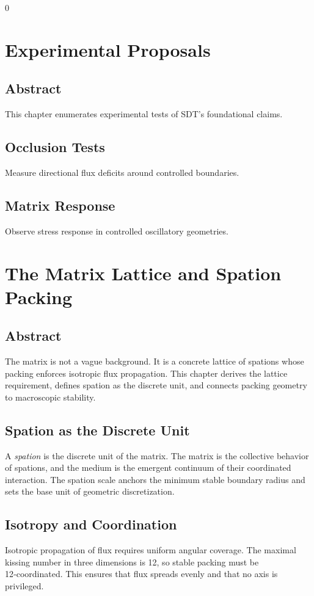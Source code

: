 0\documentclass[12pt]{book}
\begin{document}
\chapter{Experimental Proposals}

\section*{Abstract}
This chapter enumerates experimental tests of SDT’s foundational claims.

\section{Occlusion Tests}
Measure directional flux deficits around controlled boundaries.

\section{Matrix Response}
Observe stress response in controlled oscillatory geometries.

\chapter{The Matrix Lattice and Spation Packing}

\section*{Abstract}
The matrix is not a vague background. It is a concrete lattice of spations whose packing enforces
isotropic flux propagation. This chapter derives the lattice requirement, defines spation as the discrete
unit, and connects packing geometry to macroscopic stability.

\section{Spation as the Discrete Unit}
A \textit{spation} is the discrete unit of the matrix. The matrix is the collective behavior of spations,
and the medium is the emergent continuum of their coordinated interaction. The spation scale anchors the
minimum stable boundary radius and sets the base unit of geometric discretization.

\section{Isotropy and Coordination}
Isotropic propagation of flux requires uniform angular coverage. The maximal kissing number in three
dimensions is 12, so stable packing must be 12‑coordinated. This ensures that flux spreads evenly and
that no axis is privileged.
\end{document}
